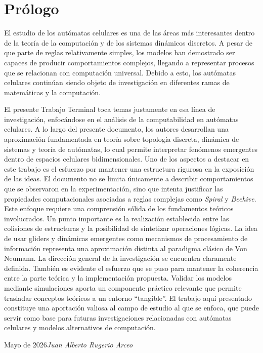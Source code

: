 %
%


\chapter*{Prólogo}

El estudio de los autómatas celulares es una de las áreas más interesantes dentro de la teoría de la computación y de los sistemas dinámicos discretos. A pesar de que parte de reglas relativamente simples, los modelos han demostrado ser capaces de producir comportamientos complejos, llegando a representar procesos que se relacionan con computación universal. Debido a esto, los autómatas celulares continúan siendo objeto de investigación en diferentes ramas de matemáticas y la computación.

El presente Trabajo Terminal toca temas justamente en esa línea de investigación, enfocándose en el análisis de la computabilidad en autómatas celulares. A lo largo del presente documento, los autores desarrollan una aproximación fundamentada en teoría sobre topología discreta, dinámica de sistemas y teoría de autómatas, lo cual permite interpretar fenómenos emergentes dentro de espacios celulares bidimensionales.
Uno de los aspectos a destacar en este trabajo es el esfuerzo por mantener una estructura rigurosa en la exposición de las ideas. El documento no se limita únicamente a describir comportamientos que se observaron en la experimentación, sino que intenta justificar las propiedades computacionales asociadas a reglas complejas como \textit{Spiral} y \textit{Beehive}. Este enfoque requiere una comprensión sólida de los fundamentos teóricos involucrados.
Un punto importante es la realización establecida entre las colisiones de estructuras y la posibilidad de sintetizar operaciones lógicas. La idea de usar gliders y dinámicas emergentes como mecanismos de procesamiento de información representa una aproximación distinta al paradigma clásico de Von Neumann. La dirección general de la investigación se encuentra claramente definida.
También es evidente el esfuerzo que se puso para mantener la coherencia entre la parte teórica y la implementación propuesta. Validar los modelos mediante simulaciones aporta un componente práctico relevante que permite trasladar conceptos teóricos a un entorno “tangible”.
El trabajo aquí presentado constituye una aportación valiosa al campo de estudio al que se enfoca, que puede servir como base para futuras investigaciones relacionadas con autómatas celulares y modelos alternativos de computación.


\vspace{\baselineskip}
\begin{flushright}\noindent
Mayo de 2026\hfill {\it Juan Alberto Rugerio Arceo}\\
\end{flushright}


